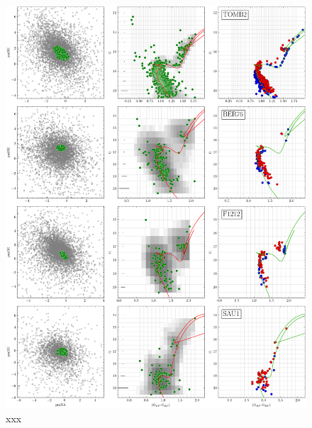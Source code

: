 \documentclass[referee]{aa}
\begin{document}
\begin{appendix}
 \begin{figure}
  \centering
  \includegraphics[height=.95\textheight]{figs/4_fpars.png}
  \caption{xxx}
  \label{fig:4fpars}
 \end{figure}


\end{appendix}
\end{document}

